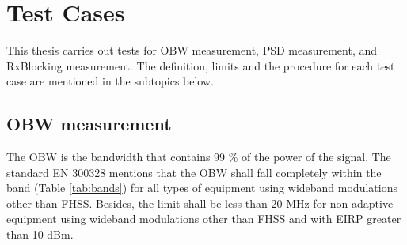 \chapter{Test Cases}\label{chap:test}

This thesis carries out tests for \acf{OBW} measurement, \acf{PSD} measurement, and \acf{RxBlocking} measurement. The definition, limits and the procedure for each test case are mentioned in the subtopics below.

\section{\acl{OBW} measurement}
\label{sec:obw}

The \acf{OBW} is the bandwidth that contains 99 \% of the power of the signal. The standard EN 300328 mentions that the \acf{OBW} shall fall completely within the band (Table \ref{tab:bands}) for all types of equipment using wideband modulations other than \acs{FHSS}.  Besides, the limit shall be less than 20 MHz for non-adaptive equipment using wideband modulations other than \acs{FHSS} and with \acs{EIRP} greater than 10 dBm.

